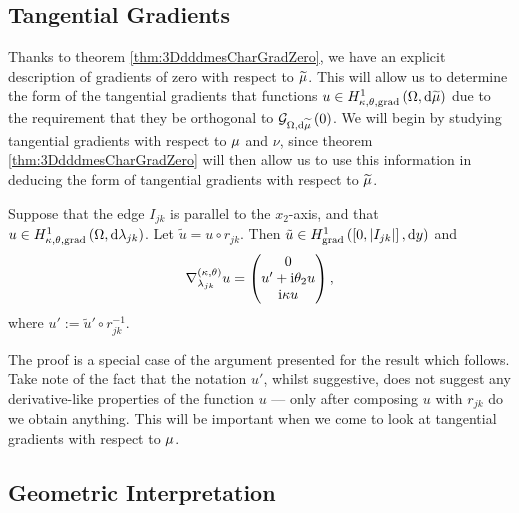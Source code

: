 \subsection{Tangential Gradients} \label{ssec:3DTangGradients}
Thanks to theorem \ref{thm:3DdddmesCharGradZero}, we have an explicit description of gradients of zero with respect to $\widetilde{\mu}$.
This will allow us to determine the form of the tangential gradients that functions $u\in H^1_{\kappa,\theta,\mathrm{grad}}\left( \Omega, \mathrm{d}\widetilde{\mu} \right)$ due to the requirement that they be orthogonal to $\mathcal{G}_{ \Omega, \mathrm{d}\widetilde{\mu}}\left( 0 \right)$.
We will begin by studying tangential gradients with respect to $\mu$ and $\nu$, since theorem \ref{thm:3DdddmesCharGradZero} will then allow us to use this information in deducing the form of tangential gradients with respect to $\widetilde{\mu}$.
\begin{prop} \label{prop:3DTangGradParallel}
	\sloppy Suppose that the edge $I_{jk}$ is parallel to the $x_2$-axis, and that $u\in H^1_{\kappa,\theta,\mathrm{grad}}\left( \Omega, \mathrm{d}\lambda_{jk} \right)$.
	Let $\tilde{u} = u\circ r_{jk}$.
	Then $\tilde{u}\in H^1_\mathrm{grad}\left( \left[ 0,\left\lvert I_{jk} \right\rvert \right], \mathrm{d}y \right)$ and
	\begin{align*}
		\nabla^{\left( \kappa, \theta \right)}_{\lambda_{jk}}u = 
		\begin{pmatrix}
			0 \\ u' + \mathrm{i}\theta_2 u \\ \mathrm{i}\kappa u
		\end{pmatrix},
	\end{align*}
	where $u' := \tilde{u}'\circ r_{jk}^{-1}$.
\end{prop}
The proof is a special case of the argument presented for the result which follows.
Take note of the fact that the notation $u'$, whilst suggestive, does not suggest any derivative-like properties of the function $u$ --- only after composing $u$ with $r_{jk}$ do we obtain anything.
This will be important when we come to look at tangential gradients with respect to $\mu$.

\subsection{Geometric Interpretation} \label{ssec:3DGradGeometric}
